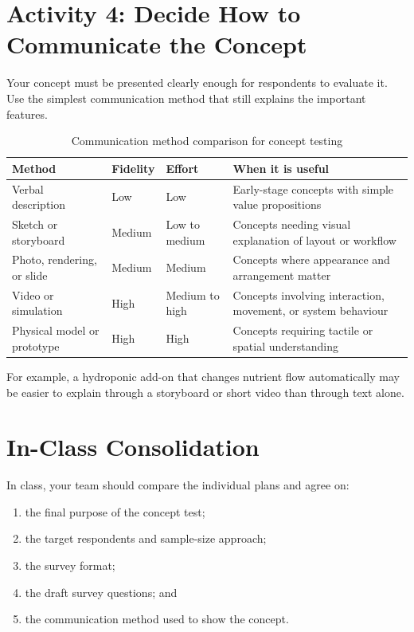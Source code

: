 \section{Activity 4: Decide How to Communicate the Concept}

Your concept must be presented clearly enough for respondents to evaluate it. Use the simplest communication method that still explains the important features.

\begin{table}[htbp]
\centering
\caption{Communication method comparison for concept testing}
\label{tab:session12-communication-matrix}
\renewcommand{\arraystretch}{1.2}
\begin{tabularx}{\textwidth}{|>{\raggedright\arraybackslash}p{}|>{\raggedright\arraybackslash}p{}|>{\raggedright\arraybackslash}p{}|X|}
\hline
\textbf{Method} & \textbf{Fidelity} & \textbf{Effort} & \textbf{When it is useful} \\
\hline
Verbal description & Low & Low & Early-stage concepts with simple value propositions \\
\hline
Sketch or storyboard & Medium & Low to medium & Concepts needing visual explanation of layout or workflow \\
\hline
Photo, rendering, or slide & Medium & Medium & Concepts where appearance and arrangement matter \\
\hline
Video or simulation & High & Medium to high & Concepts involving interaction, movement, or system behaviour \\
\hline
Physical model or prototype & High & High & Concepts requiring tactile or spatial understanding \\
\hline
\end{tabularx}
\end{table}

For example, a hydroponic add-on that changes nutrient flow automatically may be easier to explain through a storyboard or short video than through text alone.

\section{In-Class Consolidation}

In class, your team should compare the individual plans and agree on:
\begin{enumerate}
    \item the final purpose of the concept test;
    \item the target respondents and sample-size approach;
    \item the survey format;
    \item the draft survey questions; and
    \item the communication method used to show the concept.
\end{enumerate}

